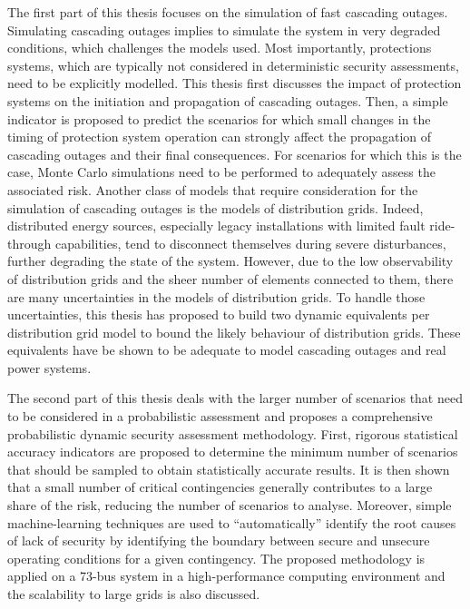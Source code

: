 The first part of this thesis focuses on the simulation of fast cascading outages. Simulating cascading outages implies to simulate the system in very degraded conditions, which challenges the models used. Most importantly, protections systems, which are typically not considered in deterministic security assessments, need to be explicitly modelled. This thesis first discusses the impact of protection systems on the initiation and propagation of cascading outages. Then, a simple indicator is proposed to predict the scenarios for which small changes in the timing of protection system operation can strongly affect the propagation of cascading outages and their final consequences. For scenarios for which this is the case, Monte Carlo simulations need to be performed to adequately assess the associated risk. Another class of models that require consideration for the simulation of cascading outages is the models of distribution grids. Indeed, distributed energy sources, especially legacy installations with limited fault ride-through capabilities, tend to disconnect themselves during severe disturbances, further degrading the state of the system. However, due to the low observability of distribution grids and the sheer number of elements connected to them, there are many uncertainties in the models of distribution grids. To handle those uncertainties, this thesis has proposed to build two dynamic equivalents per distribution grid model to bound the likely behaviour of distribution grids. These equivalents have be shown to be adequate to model cascading outages and real power systems.

The second part of this thesis deals with the larger number of scenarios that need to be considered in a probabilistic assessment and proposes a comprehensive probabilistic dynamic security assessment methodology. First, rigorous statistical accuracy indicators are proposed to determine the minimum number of scenarios that should be sampled to obtain statistically accurate results. It is then shown that a small number of critical contingencies generally contributes to a large share of the risk, reducing the number of scenarios to analyse. Moreover, simple machine-learning techniques are used to ``automatically'' identify the root causes of lack of security by identifying the boundary between secure and unsecure operating conditions for a given contingency. The proposed methodology is applied on a 73-bus system in a high-performance computing environment and the scalability to large grids is also discussed.
